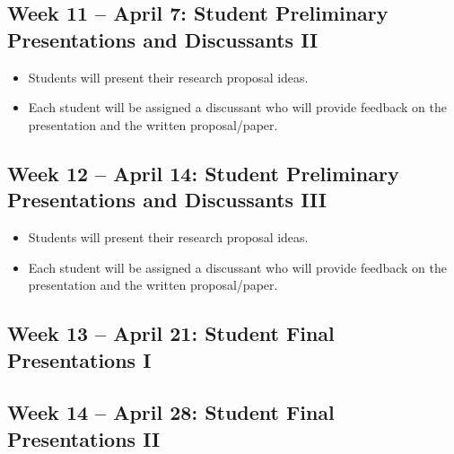 \documentclass[11pt]{article}
\begin{document}
\subsection*{Week 11 -- April 7: Student Preliminary Presentations and Discussants II}
\begin{itemize}
    \setlength{\itemsep}{0em}
    \item Students will present their research proposal ideas.
    \item Each student will be assigned a discussant who will provide feedback on the presentation and the written proposal/paper.
\end{itemize}

\subsection*{Week 12 -- April 14: Student Preliminary Presentations and Discussants III}
\begin{itemize}
    \setlength{\itemsep}{0em}
    \item Students will present their research proposal ideas.
    \item Each student will be assigned a discussant who will provide feedback on the presentation and the written proposal/paper.
\end{itemize}

\subsection*{Week 13 -- April 21: Student Final Presentations I}

\vspace{1em}

\subsection*{Week 14 -- April 28: Student Final Presentations II}
\end{document}
